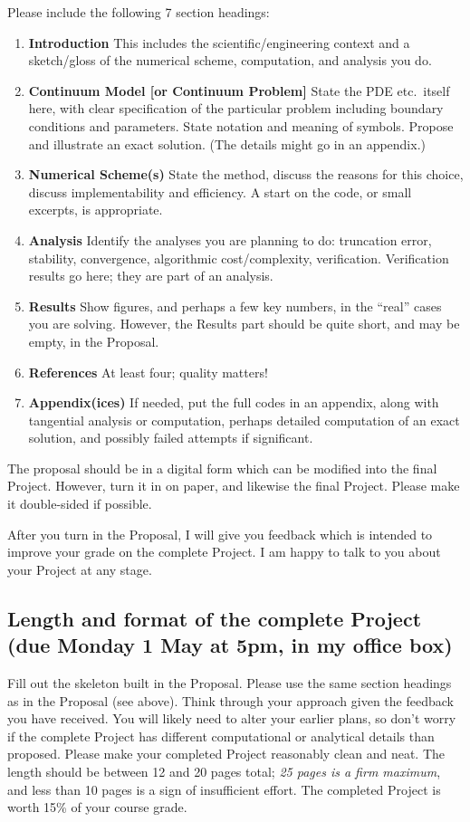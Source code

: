 \documentclass[11pt]{amsart}
\begin{document}
Please include the following 7 section headings:
\renewcommand{\labelenumi}{\arabic{enumi}.}
\begin{enumerate}
\item \textbf{Introduction}  This includes the scientific/engineering context and a sketch/gloss of the numerical scheme, computation, and analysis you do.
\item \textbf{Continuum Model [or Continuum Problem]}  State the PDE etc.~itself here, with clear specification of the particular problem including boundary conditions and parameters.  State notation and meaning of symbols.  Propose and illustrate an exact solution.  (The details might go in an appendix.)
\item \textbf{Numerical Scheme(s)}  State the method, discuss the reasons for this choice, discuss implementability and efficiency.  A start on the code, or small excerpts, is appropriate.
\item \textbf{Analysis}  Identify the analyses you are planning to do: truncation error, stability, convergence, algorithmic cost/complexity, verification.  Verification results go here; they are part of an analysis.
\item \textbf{Results}  Show figures, and perhaps a few key numbers, in the ``real'' cases you are solving.  However, the Results part should be quite short, and may be empty, in the Proposal.
\item[] \textbf{References}  At least four; quality matters!
\item[] \textbf{Appendix(ices)}  If needed, put the full codes in an appendix, along with tangential analysis or computation, perhaps detailed computation of an exact solution, and possibly failed attempts if significant.
\end{enumerate}

The proposal should be in a digital form which can be modified into the final Project.  However, turn it in on paper, and likewise the final Project.  Please make it double-sided if possible.

After you turn in the Proposal, I will give you feedback which is intended to improve your grade on the complete Project.  I am happy to talk to you about your Project at any stage.


\subsection*{Length and format of the complete Project (due Monday 1 May at 5pm, in my office box)}  Fill out the skeleton built in the Proposal.  Please use the same section headings as in the Proposal (see above).  Think through your approach given the feedback you have received.  You will likely need to alter your earlier plans, so don't worry if the complete Project has different computational or analytical details than proposed.  Please make your completed Project reasonably clean and neat.  The length should be between 12 and 20 pages total; \emph{25 pages is a firm maximum}, and less than 10 pages is a sign of insufficient effort.  The completed Project is worth 15\% of your course grade.
\end{document}
